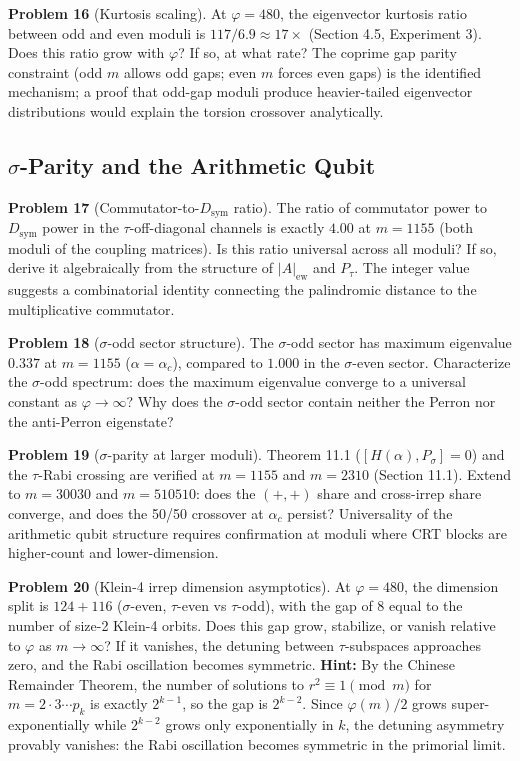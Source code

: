 \documentclass[11pt,letterpaper]{article}
\theoremstyle{definition}
\theoremstyle{remark}
\begin{document}
\textbf{Problem 16} (Kurtosis scaling). At $\varphi = 480$, the eigenvector kurtosis ratio between odd and even moduli is $117 / 6.9 \approx 17\times$ (Section 4.5, Experiment 3). Does this ratio grow with $\varphi$? If so, at what rate? The coprime gap parity constraint (odd $m$ allows odd gaps; even $m$ forces even gaps) is the identified mechanism; a proof that odd-gap moduli produce heavier-tailed eigenvector distributions would explain the torsion crossover analytically.

\subsection{\texorpdfstring{$\sigma$-Parity and the Arithmetic Qubit}{\textbackslash sigma-Parity and the Arithmetic Qubit}}\label{sigma-parity-and-the-arithmetic-qubit}

\textbf{Problem 17} (Commutator-to-$D_{\text{sym}}$ ratio). The ratio of commutator power to $D_{\text{sym}}$ power in the $\tau$-off-diagonal channels is exactly $4.00$ at $m = 1155$ (both moduli of the coupling matrices). Is this ratio universal across all moduli? If so, derive it algebraically from the structure of $|A|_{\text{ew}}$ and $P_\tau$. The integer value suggests a combinatorial identity connecting the palindromic distance to the multiplicative commutator.

\textbf{Problem 18} ($\sigma$-odd sector structure). The $\sigma$-odd sector has maximum eigenvalue $0.337$ at $m = 1155$ ($\alpha = \alpha_c$), compared to $1.000$ in the $\sigma$-even sector. Characterize the $\sigma$-odd spectrum: does the maximum eigenvalue converge to a universal constant as $\varphi \to \infty$? Why does the $\sigma$-odd sector contain neither the Perron nor the anti-Perron eigenstate?

\textbf{Problem 19} ($\sigma$-parity at larger moduli). Theorem 11.1 ($[H(\alpha), P_\sigma] = 0$) and the $\tau$-Rabi crossing are verified at $m = 1155$ and $m = 2310$ (Section 11.1). Extend to $m = 30030$ and $m = 510510$: does the $(+,+)$ share and cross-irrep share converge, and does the 50/50 crossover at $\alpha_c$ persist? Universality of the arithmetic qubit structure requires confirmation at moduli where CRT blocks are higher-count and lower-dimension.

\textbf{Problem 20} (Klein-4 irrep dimension asymptotics). At $\varphi = 480$, the dimension split is $124 + 116$ ($\sigma$-even, $\tau$-even vs $\tau$-odd), with the gap of $8$ equal to the number of size-2 Klein-4 orbits. Does this gap grow, stabilize, or vanish relative to $\varphi$ as $m \to \infty$? If it vanishes, the detuning between $\tau$-subspaces approaches zero, and the Rabi oscillation becomes symmetric. \textbf{Hint:} By the Chinese Remainder Theorem, the number of solutions to $r^2 \equiv 1 \pmod{m}$ for $m = 2 \cdot 3 \cdots p_k$ is exactly $2^{k-1}$, so the gap is $2^{k-2}$. Since $\varphi(m)/2$ grows super-exponentially while $2^{k-2}$ grows only exponentially in $k$, the detuning asymmetry provably vanishes: the Rabi oscillation becomes symmetric in the primorial limit.
\end{document}
